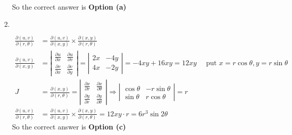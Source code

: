 \begin{enumerate}
\begin{answer}
			So the correct answer is \textbf{Option (a)}
	\end{answer}
		\item  $\left. \right. $
	\begin{answer}
		\begin{align*}
		\frac{\partial(u, v)}{\partial(r, \theta)}&=\frac{\partial(u, v)}{\partial(x, y)} \times \frac{\partial(x, y)}{\partial(r, \theta)}\\
		\frac{\partial(u, v)}{\partial(x, y)}&=\left|\begin{array}{ll}\frac{\partial u}{\partial x} & \frac{\partial u}{\partial v} \\ \frac{\partial v}{\partial x} & \frac{\partial v}{\partial y}\end{array}\right|=\left|\begin{array}{cc}2 x & -4 y \\ 4 x & -2 y\end{array}\right|=-4 x y+16 x y=12 x y \quad\text{ put }x=r \cos \theta, y=r \sin \theta\\
		J&=\frac{\partial(x, y)}{\partial(r, \theta)}=\left|\begin{array}{ll}\frac{\partial x}{\partial r} & \frac{\partial x}{\partial \theta} \\ \frac{\partial y}{\partial r} & \frac{\partial y}{\partial \theta}\end{array}\right| \Rightarrow\left|\begin{array}{cc}\cos \theta & -r \sin \theta \\ \sin \theta & r \cos \theta\end{array}\right|=r\\
		\frac{\partial(u, v)}{\partial(r, \theta)}&=\frac{\partial(u, v)}{\partial(x, y)} \times \frac{\partial(x, y)}{\partial(r, \theta)}=12 x y \cdot r=6 r^{3} \sin 2 \theta
		\end{align*}
		So the correct answer is \textbf{Option (c)}
	\end{answer}
	
	
	

	
	
	
	
	
	
	
\end{enumerate}